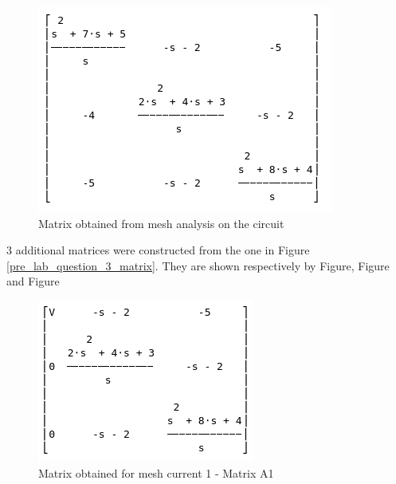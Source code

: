 \documentclass[12pt, a4paper]{article}
\begin{document}
	\begin{figure}[H]
		\centering
		\includegraphics[width=\textwidth]{pre_lab_question_3_matrix}
		\caption{Matrix obtained from mesh analysis on the circuit}
		\label{fig:pre_lab_question_3_matrix}
	\end{figure}


	3 additional matrices were constructed from the one in Figure \ref{pre_lab_question_3_matrix}. They are shown respectively by Figure, Figure and Figure 

	\begin{figure}[H]
		\centering
		\includegraphics[width=\textwidth]{pre_lab_question_3_a1}
		\caption{Matrix obtained for mesh current 1 - Matrix A1}
		\label{fig:pre_lab_question_3_a1}
	\end{figure}
\end{document}
